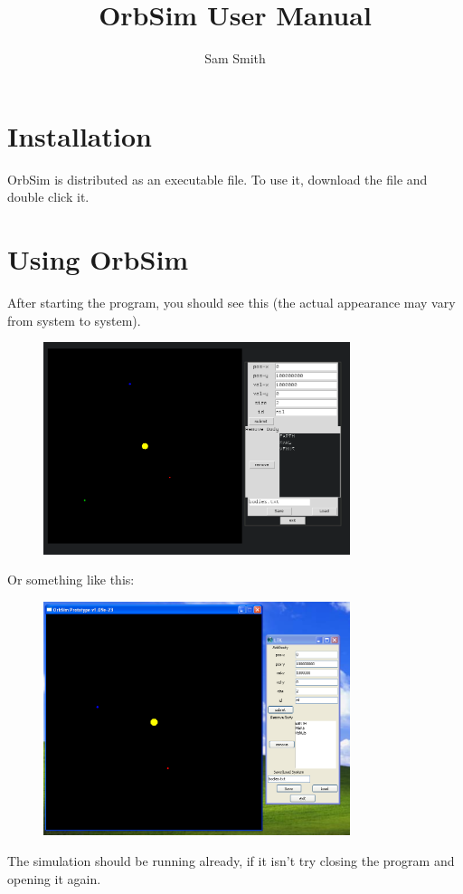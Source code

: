 \documentclass[a4paper,11pt,titlepage]{article}
\author{Sam Smith}
\title{OrbSim User Manual}
\date{}
\begin{document}
\maketitle
\tableofcontents
\clearpage

\section{Installation}
OrbSim is distributed as an executable file. To use it, download the file and
double click it.

\section{Using OrbSim}

After starting the program, you should see this (the actual appearance may vary
from system to system).
\begin{figure}[H]
	\centering
	\includegraphics[width=0.8\textwidth]{../img/start.png}
\end{figure}

Or something like this:

\begin{figure}[H]
	\centering
	\includegraphics[width=0.8\textwidth]{../img/win.png}
\end{figure}
The simulation should be running already, if it isn't try closing the program
and opening it again.
\end{document}
